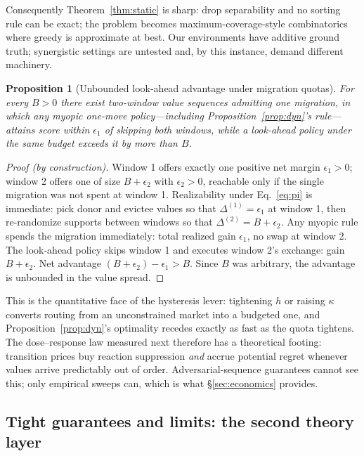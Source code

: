 \documentclass[10pt,twocolumn]{article}
\newtheorem{proposition}{Proposition}
\theoremstyle{definition}
\begin{document}
Consequently Theorem~\ref{thm:static} is sharp: drop separability and no sorting rule can be exact; the
problem becomes maximum-coverage-style combinatorics where greedy is approximate at best. Our environments
have additive ground truth; synergistic settings are untested and, by this instance, demand different
machinery.

\begin{proposition}[Unbounded look-ahead advantage under migration quotas]\label{prop:lookahead}
For every $B>0$ there exist two-window value sequences admitting one migration, in which any myopic
one-move policy---including Proposition~\ref{prop:dyn}'s rule---attains score within $\epsilon_1$ of
skipping both windows, while a look-ahead policy under the same budget exceeds it by more than $B$.
\end{proposition}

\begin{proof}[Proof (by construction)]
Window 1 offers exactly one positive net margin $\epsilon_1>0$; window 2 offers one of size $B+\epsilon_2$
with $\epsilon_2>0$, reachable only if the single migration was not spent at window 1. Realizability under
Eq.~\eqref{eq:pi} is immediate: pick donor and evictee values so that $\Delta^{(1)}=\epsilon_1$ at window 1,
then re-randomize supports between windows so that $\Delta^{(2)}=B+\epsilon_2$. Any myopic rule spends the
migration immediately: total realized gain $\epsilon_1$, no swap at window 2. The look-ahead policy skips
window 1 and executes window 2's exchange: gain $B+\epsilon_2$. Net advantage $(B+\epsilon_2)-\epsilon_1>B$.
Since $B$ was arbitrary, the advantage is unbounded in the value spread.
\end{proof}

This is the quantitative face of the hysteresis lever: tightening $h$ or raising $\kappa$ converts routing
from an unconstrained market into a budgeted one, and Proposition~\ref{prop:dyn}'s optimality recedes
exactly as fast as the quota tightens. The dose--response law measured next therefore has a theoretical
footing: transition prices buy reaction suppression \emph{and} accrue potential regret whenever values
arrive predictably out of order. Adversarial-sequence guarantees cannot see this; only empirical sweeps can,
which is what \S\ref{sec:economics} provides.

\subsection{Tight guarantees and limits: the second theory layer}\label{sec:theory2}
\end{document}
